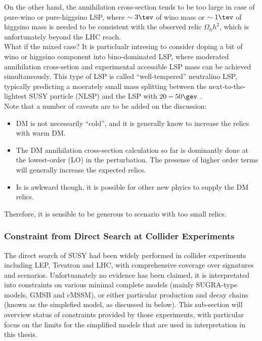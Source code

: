 On the other hand, 
the annihilation cross-section tends to be too large in case of pure-wino or pure-higgsino LSP, where $\sim 3\tev$ of wino mass or $\sim 1\tev$ of higgsino mass is needed to be consistent with the observed relic $\Omega_h h^2$, which is unfortunately beyond the LHC reach. \\

What if the mixed case? It is particlualr intresing to consider doping a bit of wino or higgsino component into bino-dominated LSP, where moderated annihilation cross-setion and experimental accessible LSP mass can be achieved simultaneously. This type of LSP is called ``well-tempered'' neutralino LSP, typically predicting a moerately small mass splitting between the next-to-the-lightest SUSY particle (NLSP) and the LSP with $20-50\gev$ \cite{WTN_calcdM}. \\

Note that a number of caveats are to be added on the discussion:
\begin{itemize}
\item DM is not necessarily ``cold'', and it is generally know to increase the relics with warm DM. \\
\item The DM annihilation cross-section calculation so far is dominantly done at the lowest-order (LO) in the perturbation. 
The presense of higher order terms will generally increase the expected relics. 
\item Is is awkward though, it is possible for other new phyics to supply the DM relics.
\end{itemize}
Therefore, it is sensible to be generous to scenario with too small relics.

			
\subsubsection{Constraint from Direct Search at Collider Experiments} 
The direct search of SUSY had been widely performed in collider experiments including LEP, Tevatron and LHC, with comprehensive coverage over signatures and scenarios. Unfortuanately no evidence has been claimed, it is interpretated into constraints on various minimal complete models (mainly SUGRA-type models, GMSB and cMSSM), or either particular production and decay chains (known as the simplefied model, as discussed in below).
This sub-section will overview status of constraints provided by those experiments,
with particular focus on the limits for the simplified models 
that are used in interpretation in this thesis. \\

